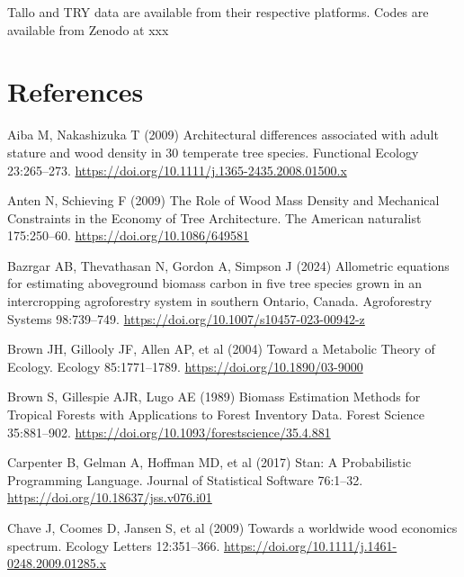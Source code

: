 \documentclass[
  12pt,
  letterpaper,
  DIV=11,
  numbers=noendperiod]{scrartcl}
\newlength{\cslhangindent}
\newenvironment{CSLReferences}[2] %
 {\begin{list}{}{%
  \setlength{\itemindent}{0pt}
  \setlength{\leftmargin}{0pt}
  \setlength{\parsep}{0pt}
  \ifodd #1
   \setlength{\leftmargin}{\cslhangindent}
   \setlength{\itemindent}{-1\cslhangindent}
  \fi
  \setlength{\itemsep}{#2\baselineskip}}}
 {\end{list}}
\begin{document}
Tallo and TRY data are available from their respective platforms. Codes
are available from Zenodo at xxx

\newpage

\section*{References}\label{references}

\label{refs}
\begin{CSLReferences}{1}{1}
Aiba M, Nakashizuka T (2009) Architectural differences associated with
adult stature and wood density in 30 temperate tree species. Functional
Ecology 23:265--273.
\url{https://doi.org/10.1111/j.1365-2435.2008.01500.x}

Anten N, Schieving F (2009) The {Role} of {Wood} {Mass} {Density} and
{Mechanical} {Constraints} in the {Economy} of {Tree} {Architecture}.
The American naturalist 175:250--60.
\url{https://doi.org/10.1086/649581}

Bazrgar AB, Thevathasan N, Gordon A, Simpson J (2024) Allometric
equations for estimating aboveground biomass carbon in five tree species
grown in an intercropping agroforestry system in southern {Ontario},
{Canada}. Agroforestry Systems 98:739--749.
\url{https://doi.org/10.1007/s10457-023-00942-z}

Brown JH, Gillooly JF, Allen AP, et al (2004) Toward a {Metabolic}
{Theory} of {Ecology}. Ecology 85:1771--1789.
\url{https://doi.org/10.1890/03-9000}

Brown S, Gillespie AJR, Lugo AE (1989) Biomass {Estimation} {Methods}
for {Tropical} {Forests} with {Applications} to {Forest} {Inventory}
{Data}. Forest Science 35:881--902.
\url{https://doi.org/10.1093/forestscience/35.4.881}

Carpenter B, Gelman A, Hoffman MD, et al (2017) Stan: {A}
{Probabilistic} {Programming} {Language}. Journal of Statistical
Software 76:1--32. \url{https://doi.org/10.18637/jss.v076.i01}

Chave J, Coomes D, Jansen S, et al (2009) Towards a worldwide wood
economics spectrum. Ecology Letters 12:351--366.
\url{https://doi.org/10.1111/j.1461-0248.2009.01285.x}


\end{CSLReferences}
\end{document}

